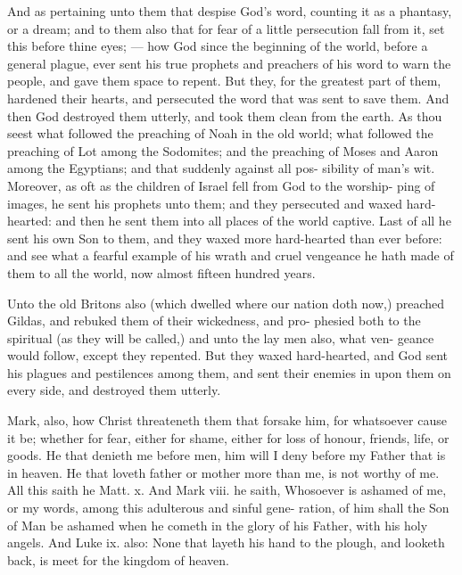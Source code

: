 \documentclass{custom}
\begin{document}
And as pertaining unto them that despise 
God's word, counting it as a phantasy, or a 
dream; and to them also that for fear of a little 
persecution fall from it, set this before thine 
eyes; — how God since the beginning of the 
world, before a general plague, ever sent his 
true prophets and preachers of his word to warn 
the people, and gave them space to repent. But 
they, for the greatest part of them, hardened 
their hearts, and persecuted the word that was 
sent to save them. And then God destroyed 
them utterly, and took them clean from the earth. 
As thou seest what followed the preaching of 
Noah in the old world; what followed the 
preaching of Lot among the Sodomites; and
the preaching of Moses and Aaron among the 
Egyptians; and that suddenly against all pos- 
sibility of man's wit. Moreover, as oft as the 
children of Israel fell from God to the worship- 
ping of images, he sent his prophets unto them;
and they persecuted and waxed hard-hearted:
and then he sent them into all places of the world 
captive. Last of all he sent his own Son to 
them, and they waxed more hard-hearted than 
ever before: and see what a fearful example of 
his wrath and cruel vengeance he hath made of 
them to all the world, now almost fifteen 
hundred years. 

Unto the old Britons also (which dwelled 
where our nation doth now,) preached Gildas, 
and rebuked them of their wickedness, and pro- 
phesied both to the spiritual (as they will be 
called,) and unto the lay men also, what ven- 
geance would follow, except they repented. But 
they waxed hard-hearted, and God sent his 
plagues and pestilences among them, and sent 
their enemies in upon them on every side, and 
destroyed them utterly. 

Mark, also, how Christ threateneth them that 
forsake him, for whatsoever cause it be; whether 
for fear, either for shame, either for loss of 
honour, friends, life, or goods. He that denieth 
me before men, him will I deny before my 
Father that is in heaven. He that loveth father 
or mother more than me, is not worthy of me. 
All this saith he Matt. x. And Mark viii. he 
saith, Whosoever is ashamed of me, or my
words, among this adulterous and sinful gene- 
ration, of him shall the Son of Man be ashamed 
when he cometh in the glory of his Father, with 
his holy angels. And Luke ix. also: None 
that layeth his hand to the plough, and looketh 
back, is meet for the kingdom of heaven.
\end{document}
